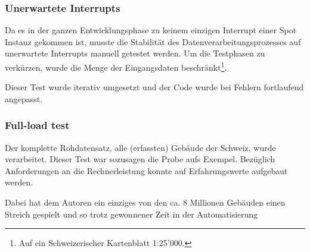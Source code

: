 \subsubsection{Unerwartete Interrupts}
Da es in der ganzen Entwicklungsphase zu keinem einzigen Interrupt einer Spot Instanz gekommen ist, musste die Stabilität des Datenverarbeitungsprozesses auf unerwartete Interrupts manuell getestet werden. Um die Testphasen zu verkürzen, wurde die Menge der Eingangsdaten beschränkt\footnote{Auf ein Schweizerischer Kartenblatt 1:25'000.}.

Dieser Test wurde iterativ umgesetzt und der Code wurde bei Fehlern fortlaufend angepasst. 


\subsubsection{Full-load test}
Der komplette Rohdatensatz, alle (erfassten) Gebäude der Schweiz, wurde verarbeitet. Dieser Test war sozusagen die Probe aufs Exempel. Bezüglich Anforderungen an die Rechnerleistung konnte auf Erfahrungswerte aufgebaut werden.

Dabei hat dem Autoren ein einziges von den ca. 8 Millionen Gebäuden einen Streich gespielt und so trotz gewonnener Zeit in der Automatisierung 

